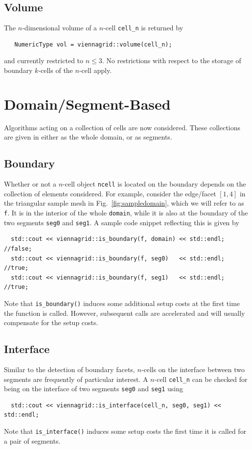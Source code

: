   \subsection{Volume}
  The $n$-dimensional volume of a $n$-cell \lstinline|cell_n| is returned by
  \begin{lstlisting}
   NumericType vol = viennagrid::volume(cell_n);
  \end{lstlisting}
  and currently restricted to $n \leq 3$. No restrictions with respect to the storage of boundary $k$-cells of the $n$-cell apply.


\section{Domain/Segment-Based}
Algorithms acting on a collection of cells are now considered. These collections are given in {\ViennaGrid} either as the whole domain, or as segments.

 \subsection{Boundary}
 Whether or not a $n$-cell object \lstinline|ncell| is located on the boundary depends on the collection of elements considered.
 For example, consider the edge/facet $[1,4]$ in the triangular sample mesh in Fig.~\ref{fig:sampledomain}, which we will refer to as \lstinline|f|.
 It is in the interior of the whole \lstinline|domain|, while it is also at the boundary of the two segments \lstinline|seg0| and \lstinline|seg1|.
 A sample code snippet reflecting this is given by
 \begin{lstlisting}
  std::cout << viennagrid::is_boundary(f, domain) << std::endl; //false;
  std::cout << viennagrid::is_boundary(f, seg0)   << std::endl; //true;
  std::cout << viennagrid::is_boundary(f, seg1)   << std::endl; //true;
 \end{lstlisting}
 Note that \lstinline|is_boundary()| induces some additional setup costs at the first time the function is called. However, subsequent calls are accelerated and will usually compensate for the setup costs.

 

 \subsection{Interface}
  Similar to the detection of boundary facets, $n$-cells on the interface between two segments are frequently of particular interest. 
  A $n$-cell \lstinline|cell_n| can be checked for being on the interface of two segments \lstinline|seg0| and \lstinline|seg1| using
 \begin{lstlisting}
  std::cout << viennagrid::is_interface(cell_n, seg0, seg1) << std::endl;
 \end{lstlisting}
 Note that \lstinline|is_interface()| induces some setup costs the first time it is called for a pair of segments.

